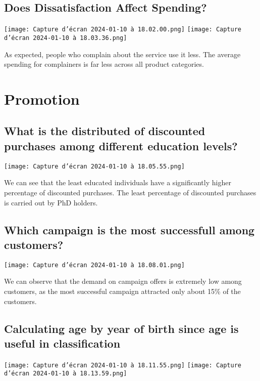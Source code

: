 \documentclass[12pt,a4paper]{report}
\begin{document}
\subsection {Does Dissatisfaction Affect Spending?}
\begin{center}
    \texttt{[image: Capture d’écran 2024-01-10 à 18.02.00.png]} 
    \texttt{[image: Capture d’écran 2024-01-10 à 18.03.36.png]}
\end{center}     
As expected, people who complain about the service use it less. The average spending for complainers is far less across all product categories.
\newpage
\section{Promotion}
\subsection {What is the distributed of discounted purchases among different education levels?}
\begin{center}
    \texttt{[image: Capture d’écran 2024-01-10 à 18.05.55.png]} 
    
\end{center}     
We can see that the least educated individuals have a significantly higher percentage of discounted purchases. The least percentage of discounted purchases is carried out by PhD holders.

\subsection {Which campaign is the most successfull among customers?}
\begin{center}
    \texttt{[image: Capture d’écran 2024-01-10 à 18.08.01.png]} 
    
\end{center}     
We can observe that the demand on campaign offers is extremely low among customers, as the most successful campaign attracted only about 15\% of the customers.
\subsection{Calculating age by year of birth since age is useful in classification}
\begin{center}
    \texttt{[image: Capture d’écran 2024-01-10 à 18.11.55.png]}
    \texttt{[image: Capture d’écran 2024-01-10 à 18.13.59.png]}
    
\end{center} 
\end{document}
